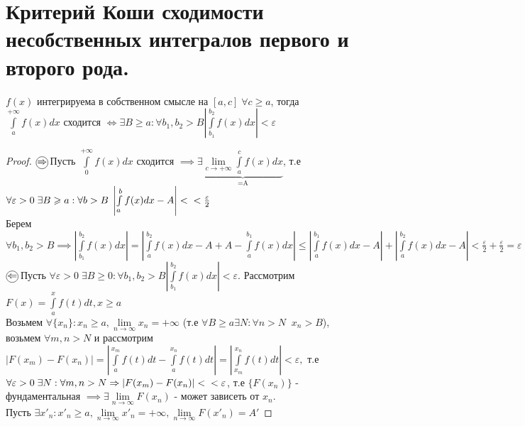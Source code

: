 \documentclass[../main.tex]{subfiles}
\begin{document}
\newpage
{}
\section{Критерий Коши сходимости несобственных интегралов первого и второго рода.}
\begin{theorem}
    $f(x)$ интегрируема в собственном смысле на $[a,c] \;\forall c\geqslant a$, тогда $\int\limits_{a}^{+\infty}f(x)dx \text{ сходится }\Leftrightarrow \exists B\geqslant a : \forall b_{1},b_{2} > B \left|\int\limits_{b_{1}}^{b_{2}} f(x)dx\right| <\varepsilon $
\end{theorem}
\begin{proof}
    $\tcircle{$\implies$}$ Пусть $\int\limits_{0}^{+\infty}f(x)dx $ сходится $\implies \exists  \underbrace{\lim\limits_{c  \to +\infty}\int\limits_{a  }^{c    } f(x)dx}_{\text{=A}}$, т.е $\forall  \varepsilon>0 \; \exists B\geqslant a: \forall b> B\;\left|\int\limits_{a    }^{b    } f(x)dx-A\right|<\\<\frac{\varepsilon}{2}$
    \\Берем $\forall b_{1},b_{2} > B\implies \left|\int\limits_{b_{1}     }^{b_{2}}f(x)dx\right| = \left| \int\limits_{a}^{b_{2}}f(x)dx-A+A-\int\limits_{a }^{b_{1}}f(x)dx \right|  \leqslant \left| \int\limits_{a   }^{b_{1}}f(x)dx-A\right| +\left| \int\limits_{a }^{b_{2}}f(x)dx -A\right| <\frac{\varepsilon}{2}+\frac{\varepsilon}{2}=\varepsilon $
    \\$\tcircle{$\impliedby$}$ Пусть $\forall \varepsilon>0 \; \exists B \geqslant 0: \forall b_{1},b_{2}> B \left| \int\limits_{b_{1}}^{b_{2}}f(x)dx\right| <\varepsilon$. Рассмотрим $F(x)=\int\limits_{a }^{x}   f(t)dt,x\geqslant a$
    \\Возьмем $\forall \{x_{n}\}: x_{n}\geqslant a, \lim\limits_{n  \to \infty} x_{n}=+\infty $ (т.е $\forall B \geqslant a \exists N : \forall n>N\;\; x_{n}>B$), возьмем $\forall m,n>N$ и рассмотрим $\left|F(x_{m})-F(x_{n})\right|=\left|\int\limits_{a    }^{x_{m}}f(t)dt-\int\limits_{a  }^{x_{n}}f(t)dt\right| = \left| \int\limits_{x_{m}}^{x_{n}}f(t)dt\right| <\varepsilon,$ т.е $\forall \varepsilon>0 \;\exists N: \forall m,n>N \implies \left|F(x_{m})-F(x_{n})\right|<\\<\varepsilon$, т.е $\{F(x_{n})\}$ - фундаментальная $\implies \exists \lim\limits_{n  \to \infty}F(x_{n})$ - может зависеть от $x_{n}$. 
    \\Пусть $\exists x'_{n}: x'_{n}\geqslant a , \lim\limits_{n \to \infty}x'_{n}=+\infty,\lim\limits_{n    \to \infty}F(x'_{n})=A'$

\end{proof}
\end{document}
